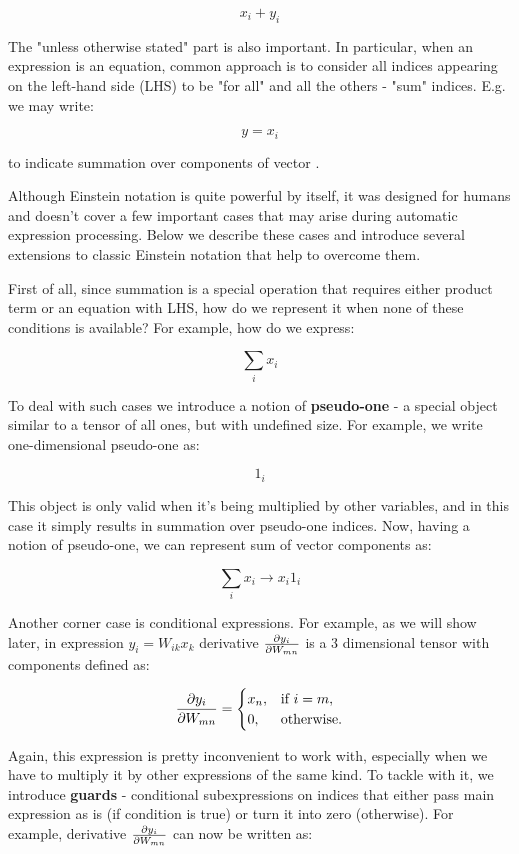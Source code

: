 \documentclass[conference]{IEEEtran}
\begin{document}
$$x_i + y_i$$

The "unless otherwise stated" part is also important. In particular,
when an expression is an equation, common approach is to consider all
indices appearing on the left-hand side (LHS) to be "for all" and all
the others - "sum" indices. E.g. we may write:

$$y = x_i$$

to indicate summation over components of vector .

Although Einstein notation is quite powerful by itself, it was
designed for humans and doesn't cover a few important cases that may
arise during automatic expression processing. Below we describe these
cases and introduce several extensions to classic Einstein notation
that help to overcome them.

First of all, since summation is a special operation that requires
either product term or an equation with LHS, how do we represent it
when none of these conditions is available? For example, how do we
express:

$$\sum_ix_i$$

To deal with such cases we introduce a notion of \textbf{pseudo-one} -
a special object similar to a tensor of all ones, but with undefined
size. For example, we write one-dimensional pseudo-one as:

$$1_i$$

This object is only valid when it's being multiplied by other
variables, and in this case it simply results in summation over
pseudo-one indices. Now, having a notion of pseudo-one, we can
represent sum of vector components as:

$$\sum_ix_i \rightarrow x_i1_i$$

Another corner case is conditional expressions. For example, as we
will show later, in expression $y_i = W_{ik}x_k$ derivative
$\pdv{y_i}{W_{mn}}$ is a 3 dimensional tensor with components defined
as:

$$\pdv{y_i}{W_{mn}} = 
\begin{cases}
  x_n, & \text{if } i = m, \\
  0, & \text{otherwise}.
\end{cases}$$

Again, this expression is pretty inconvenient to work with, especially
when we have to multiply it by other expressions of the same kind. To
tackle with it, we introduce \textbf{guards} - conditional
subexpressions on indices that either pass main expression as is (if
condition is true) or turn it into zero (otherwise). For example,
derivative $\pdv{y_i}{W_{mn}}$ can now be written as:
\end{document}
